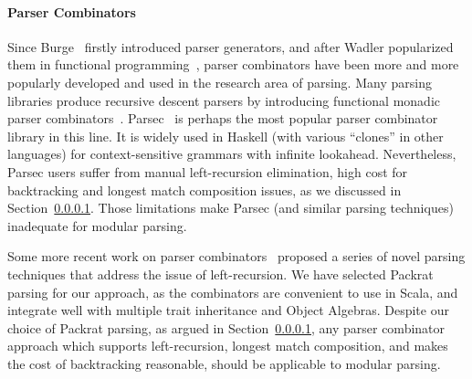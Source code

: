
\paragraph{Parser Combinators} Since Burge~\cite{burge1975} firstly
introduced parser generators, and after Wadler popularized them
in functional programming~\cite{Wadler1985}, parser combinators have been
more and more popularly developed and used in the research area of
parsing. Many parsing libraries produce recursive descent
parsers by introducing functional monadic
parser combinators~\cite{nott237}. Parsec~\cite{Leijen2001} is
perhaps the most popular parser combinator library in this line.
It is widely used in Haskell (with various ``clones'' in other languages)
for context-sensitive grammars with infinite lookahead. Nevertheless,
Parsec users suffer from manual left-recursion elimination,
high cost for backtracking and longest match composition issues,
as we discussed in Section~\ref{}. Those limitations make Parsec
(and similar parsing techniques) inadequate for modular parsing.

Some more recent work on parser
combinators~\cite{Ford2002,Might2011,Frost2008} proposed a series of
novel parsing techniques that address the issue of
left-recursion. We have selected Packrat parsing for our approach,
as the combinators are convenient to use in Scala, and
integrate well with multiple trait inheritance and
Object Algebras.
Despite our choice of Packrat parsing, as argued in Section~\ref{},
any parser combinator approach which supports left-recursion, longest
match composition, and makes the cost of backtracking reasonable,
should be applicable to modular parsing.


